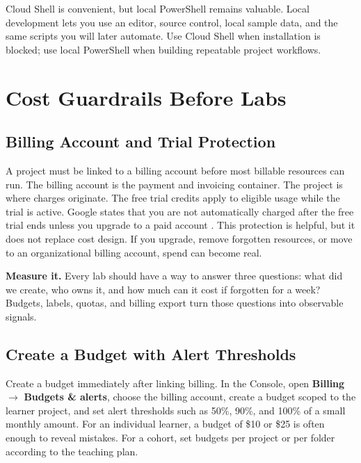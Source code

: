 Cloud Shell is convenient, but local PowerShell remains valuable. Local development lets you use an editor, source control, local sample data, and the same scripts you will later automate. Use Cloud Shell when installation is blocked; use local PowerShell when building repeatable project workflows.

\section{Cost Guardrails Before Labs}

\subsection{Billing Account and Trial Protection}
A project must be linked to a billing account before most billable resources can run. The billing account is the payment and invoicing container. The project is where charges originate. The free trial credits apply to eligible usage while the trial is active. Google states that you are not automatically charged after the free trial ends unless you upgrade to a paid account \cite{googlecloudfreeprogram}. This protection is helpful, but it does not replace cost design. If you upgrade, remove forgotten resources, or move to an organizational billing account, spend can become real.

\begin{tipbox}
\textbf{Measure it.} Every lab should have a way to answer three questions: what did we create, who owns it, and how much can it cost if forgotten for a week? Budgets, labels, quotas, and billing export turn those questions into observable signals.
\end{tipbox}

\subsection{Create a Budget with Alert Thresholds}
Create a budget immediately after linking billing. In the Console, open \textbf{Billing} $\rightarrow$ \textbf{Budgets \& alerts}, choose the billing account, create a budget scoped to the learner project, and set alert thresholds such as 50\%, 90\%, and 100\% of a small monthly amount. For an individual learner, a budget of \$10 or \$25 is often enough to reveal mistakes. For a cohort, set budgets per project or per folder according to the teaching plan.

